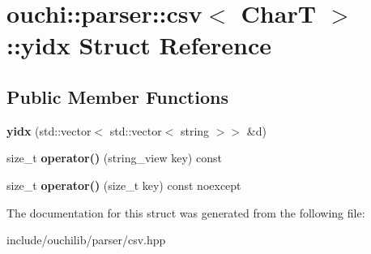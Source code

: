 \hypertarget{structouchi_1_1parser_1_1csv_1_1yidx}{}\section{ouchi\+::parser\+::csv$<$ CharT $>$\+::yidx Struct Reference}
\label{structouchi_1_1parser_1_1csv_1_1yidx}
\subsection*{Public Member Functions}
\begin{DoxyCompactItemize}
\item 
\mbox{\label{structouchi_1_1parser_1_1csv_1_1yidx_a84396ae1d31db38b5353c1ab7e5e1632}} 
{\bfseries yidx} (std\+::vector$<$ std\+::vector$<$ string $>$$>$ \&d)
\item 
\mbox{\label{structouchi_1_1parser_1_1csv_1_1yidx_a7ccf009c990ca57ebe383bcf57fa32e9}} 
size\+\_\+t {\bfseries operator()} (string\+\_\+view key) const
\item 
\mbox{\label{structouchi_1_1parser_1_1csv_1_1yidx_a2aa325016eb678f43d9f25614b3fc297}} 
size\+\_\+t {\bfseries operator()} (size\+\_\+t key) const noexcept
\end{DoxyCompactItemize}


The documentation for this struct was generated from the following file\+:\begin{DoxyCompactItemize}
\item 
include/ouchilib/parser/csv.\+hpp\end{DoxyCompactItemize}
